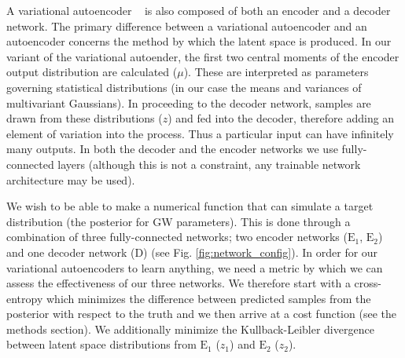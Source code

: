 \documentclass[%
showpacs,
 amsmath,amssymb,
 aps,
 twocolumn,
 prl,
 reprint,
floatfix,
]{revtex4-1}
\begin{document}
%
%
A variational autoencoder ~\cite{1812.04405} is also composed of both an
encoder and a decoder network. The primary difference between a variational
autoencoder and an autoencoder concerns the method by which the latent space is
produced. In our variant of the variational autoender, the first two central 
moments of the encoder output distribution are calculated ($\mu$). These are
interpreted as parameters governing statistical distributions (in our case the
means and variances of multivariant Gaussians). In proceeding to the decoder
network, samples are drawn from these distributions ($z$) and fed into the
decoder, therefore adding an element of variation into the process.  Thus a
particular input can have infinitely many outputs. In both the decoder and the
encoder networks we use fully-connected layers (although this is not a
constraint, any trainable network architecture may be used).


%
%
We wish to be able to make a numerical function that can
simulate a target distribution (the posterior for \ac{GW} parameters). This is done through a 
combination of three fully-connected networks; two encoder networks ($\textrm{E}_1$,
$\textrm{E}_2$) and one decoder network (D) (see Fig.
\ref{fig:network_config}). In order for our variational autoencoders to learn anything, we need a metric by which 
we can assess the effectiveness of our three networks. We therefore start with a cross-entropy which minimizes the difference between predicted samples from the posterior with respect to the truth and we then arrive at a cost function 
(see the methods section). We additionally minimize the Kullback-Leibler divergence 
between latent space distributions from $\textrm{E}_1$ ($z_1$) and 
$\textrm{E}_2$ ($z_2$). 
\end{document}
